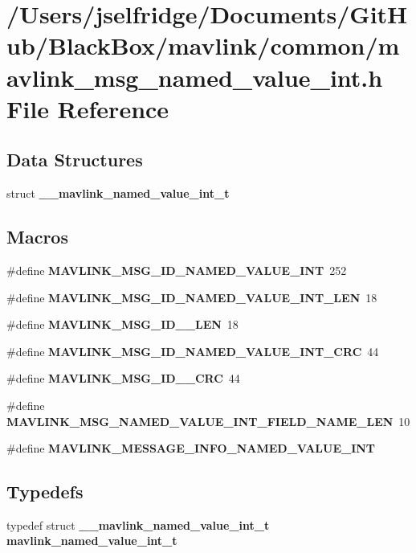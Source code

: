 \section{/\+Users/jselfridge/\+Documents/\+Git\+Hub/\+Black\+Box/mavlink/common/mavlink\+\_\+msg\+\_\+named\+\_\+value\+\_\+int.h File Reference}
\label{mavlink__msg__named__value__int_8h}
\subsection*{Data Structures}
\begin{DoxyCompactItemize}
\item 
struct \textbf{ \+\_\+\+\_\+mavlink\+\_\+named\+\_\+value\+\_\+int\+\_\+t}
\end{DoxyCompactItemize}
\subsection*{Macros}
\begin{DoxyCompactItemize}
\item 
\#define \textbf{ M\+A\+V\+L\+I\+N\+K\+\_\+\+M\+S\+G\+\_\+\+I\+D\+\_\+\+N\+A\+M\+E\+D\+\_\+\+V\+A\+L\+U\+E\+\_\+\+I\+NT}~252
\item 
\#define \textbf{ M\+A\+V\+L\+I\+N\+K\+\_\+\+M\+S\+G\+\_\+\+I\+D\+\_\+\+N\+A\+M\+E\+D\+\_\+\+V\+A\+L\+U\+E\+\_\+\+I\+N\+T\+\_\+\+L\+EN}~18
\item 
\#define \textbf{ M\+A\+V\+L\+I\+N\+K\+\_\+\+M\+S\+G\+\_\+\+I\+D\+\_\+\_\+\+L\+EN}~18
\item 
\#define \textbf{ M\+A\+V\+L\+I\+N\+K\+\_\+\+M\+S\+G\+\_\+\+I\+D\+\_\+\+N\+A\+M\+E\+D\+\_\+\+V\+A\+L\+U\+E\+\_\+\+I\+N\+T\+\_\+\+C\+RC}~44
\item 
\#define \textbf{ M\+A\+V\+L\+I\+N\+K\+\_\+\+M\+S\+G\+\_\+\+I\+D\+\_\+\_\+\+C\+RC}~44
\item 
\#define \textbf{ M\+A\+V\+L\+I\+N\+K\+\_\+\+M\+S\+G\+\_\+\+N\+A\+M\+E\+D\+\_\+\+V\+A\+L\+U\+E\+\_\+\+I\+N\+T\+\_\+\+F\+I\+E\+L\+D\+\_\+\+N\+A\+M\+E\+\_\+\+L\+EN}~10
\item 
\#define \textbf{ M\+A\+V\+L\+I\+N\+K\+\_\+\+M\+E\+S\+S\+A\+G\+E\+\_\+\+I\+N\+F\+O\+\_\+\+N\+A\+M\+E\+D\+\_\+\+V\+A\+L\+U\+E\+\_\+\+I\+NT}
\end{DoxyCompactItemize}
\subsection*{Typedefs}
\begin{DoxyCompactItemize}
\item 
typedef struct \textbf{ \+\_\+\+\_\+mavlink\+\_\+named\+\_\+value\+\_\+int\+\_\+t} \textbf{ mavlink\+\_\+named\+\_\+value\+\_\+int\+\_\+t}
\end{DoxyCompactItemize}


